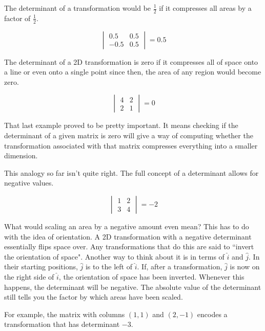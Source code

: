 The determinant of a transformation would be $\frac{1}{2}$ if it compresses all
areas by a factor of $\frac{1}{2}$.

\begin{equation*}
  \begin{vmatrix}
    0.5 & 0.5 \\
    -0.5 & 0.5
  \end{vmatrix} = 0.5
\end{equation*}

The determinant of a 2D transformation is zero if it compresses all of space
onto a line or even onto a single point since then, the area of any region would
become zero.

\begin{equation*}
  \begin{vmatrix}
    4 & 2 \\
    2 & 1
  \end{vmatrix} = 0
\end{equation*}

That last example proved to be pretty important. It means checking if the
determinant of a given matrix is zero will give a way of computing whether the
transformation associated with that matrix compresses everything into a smaller
dimension.

This analogy so far isn't quite right. The full concept of a determinant allows
for negative values.

\begin{equation*}
  \begin{vmatrix}
    1 & 2 \\
    3 & 4
  \end{vmatrix} = -2
\end{equation*}

What would scaling an area by a negative amount even mean? This has to do with
the idea of orientation. A 2D transformation with a negative determinant
essentially flips space over. Any transformations that do this are said to
``invert the orientation of space". Another way to think about it is in terms of
$\hat{i}$ and $\hat{j}$. In their starting positions, $\hat{j}$ is to the left
of $\hat{i}$. If, after a transformation, $\hat{j}$ is now on the right side of
$\hat{i}$, the orientation of space has been inverted. Whenever this happens,
the determinant will be negative. The absolute value of the determinant still
tells you the factor by which areas have been scaled.

For example, the matrix with columns $(1, 1)$ and $(2, -1)$ encodes a
transformation that has determinant $-3$.

